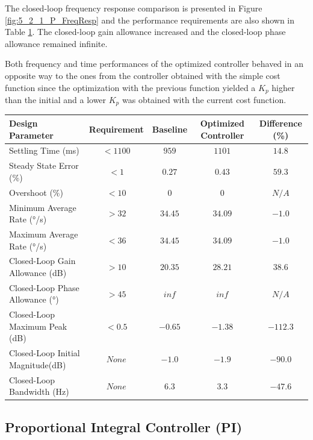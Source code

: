 The closed-loop frequency response comparison is presented in Figure \ref{fig:5_2_1_P_FreqResp} and the performance requirements are also shown in Table \ref{table:5_2_1_P_PerfTable}. The closed-loop gain allowance increased and the closed-loop phase allowance remained infinite.

Both frequency and time performances of the optimized controller behaved in an opposite way to the ones from the controller obtained with the simple cost function since the optimization with the previous function yielded a $K_p$ higher than the initial and a lower $K_p$ was obtained with the current cost function. 

\begin{table}[H]
	\label{table:5_2_1_P_PerfTable}
	\centering
	\resizebox{14cm}{!} {
		\begin{tabular}{|l|c|c|c|c|}
			\hline
			Design Parameter & Requirement & Baseline & Optimized Controller & Difference (\%) \\ \hline
			Settling Time (ms) & $< 1100$ & $959$ & $1101$ & $14.8$ \\ \hline
			Steady State Error ($\%$) & $< 1$ & $0.27$ & $0.43$ & $59.3$ \\ \hline
			Overshoot ($\%$) & $< 10$ & $0$ & $0$ & $N/A$ \\ \hline
			Minimum Average Rate ($°$/s) & $> 32$ & $34.45$ & $34.09$ & $-1.0$ \\ \hline
			Maximum Average Rate ($°$/s) & $< 36$ & $34.45$ & $34.09$ & $-1.0$ \\ \hline
			Closed-Loop Gain Allowance (dB) & $> 10$ & $20.35$ & $28.21$ & $38.6$ \\ \hline
			Closed-Loop Phase Allowance ($°$) & $> 45$ & $inf$ & $inf$ & $N/A$ \\ \hline
			Closed-Loop Maximum Peak (dB) & $< 0.5$ & $-0.65$ & $-1.38$ & $-112.3$ \\ \hline
			Closed-Loop Initial Magnitude(dB) & $None$ & $-1.0$ & $-1.9$ & $-90.0$ \\ \hline
			Closed-Loop Bandwidth (Hz) & $None$ & $6.3$ & $3.3$ & $-47.6$ \\ \hline
	\end{tabular}}
\end{table}

\subsection{Proportional Integral Controller (PI)}

